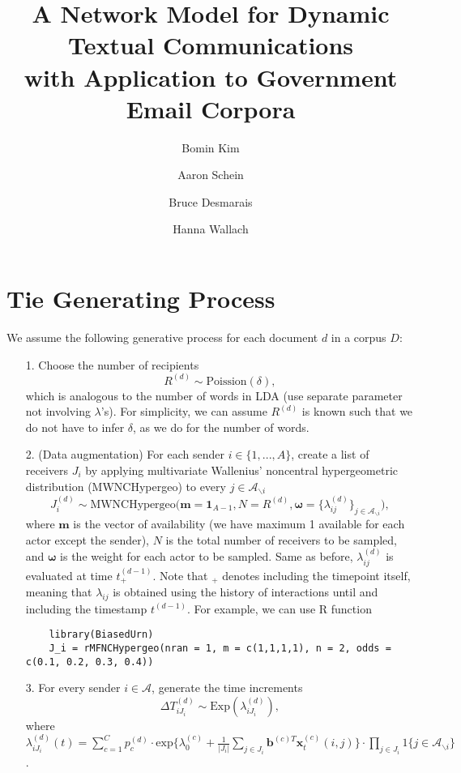 \documentclass[a4paper]{article}
\title{A Network Model for Dynamic Textual Communications \\with Application to
	Government Email Corpora}
\author[1]{Bomin Kim}
\author[3]{Aaron Schein}
\author[1]{Bruce Desmarais}
\author[2,3]{Hanna Wallach}
\affil[1]{Pennsylvania State University}
\affil[2]{Microsoft Research NYC}
\affil[3]{University of Massachusetts Amherst}
\begin{document}
\maketitle
\section{Tie Generating Process}\label{subsec: Tie Generating Process}
We assume the following generative process for each document $d$ in a corpus $D$:
\begin{itemize}
	\item[1.] Choose the number of recipients
	\begin{equation}
	R^{(d)} \sim \mbox{Poission}(\delta),
	\end{equation}
	which is analogous to the number of words in LDA (use separate parameter not involving $\lambda$'s). For simplicity, we can assume $R^{(d)}$ is known such that we do not have to infer $\delta$, as we do for the number of words. 
	\item[2.] (Data augmentation) For each sender $i \in \{1,...,A\}$, create a list of receivers $J_i$ by applying multivariate Wallenius' noncentral hypergeometric distribution (MWNCHypergeo) to every $j \in \mathcal{A}_{\backslash i}$
	\begin{equation} 
	J^{(d)}_i\sim \mbox{MWNCHypergeo}\Big(\mathbf{m} =\mathbf{1}_{A-1}, N = R^{(d)}, \boldsymbol{\omega} =\{\lambda_{ij}^{(d)}\}_{j \in \mathcal{A}_{\backslash i}} \Big),
	\end{equation}
	where $\mathbf{m}$ is the vector of availability (we have maximum 1 available for each actor except the sender), $N$ is the total number of receivers to be sampled, and $\boldsymbol{\omega}$ is the weight for each actor to be sampled. Same as before, $\lambda^{(d)}_{ij}$ is evaluated at time $t_+^{(d-1)}$. Note that $_+$ denotes including the timepoint itself, meaning that $\lambda_{ij}$ is obtained using the history of interactions until and including the timestamp $t^{(d-1)}$. For example, we can use R function
	\begin{verbatim}
	library(BiasedUrn)
	J_i = rMFNCHypergeo(nran = 1, m = c(1,1,1,1), n = 2, odds = c(0.1, 0.2, 0.3, 0.4))
	\end{verbatim}
	\item[3.] For every sender $i \in \mathcal{A}$, generate the time increments \begin{equation}
\Delta T^{(d)}_{i{J_i}} \sim \mbox{Exp}(\lambda_{i{J_i}}^{(d)}),
	\end{equation}
where $\lambda^{(d)}_{iJ_i}(t)= \sum\limits_{c=1}^{C} p^{(d)}_c\cdot\mbox{exp}\Big\{\lambda^{(c)}_0+\frac{1}{|J_i|}\sum\limits_{j \in J_i} \boldsymbol{b}^{(c)T}\boldsymbol{x}^{(c)}_t(i, j)\Big\}\cdot \prod\limits_{j \in J_i}1\{j \in \mathcal{A}_{\backslash i}\}$.

\end{itemize}
\end{document}
